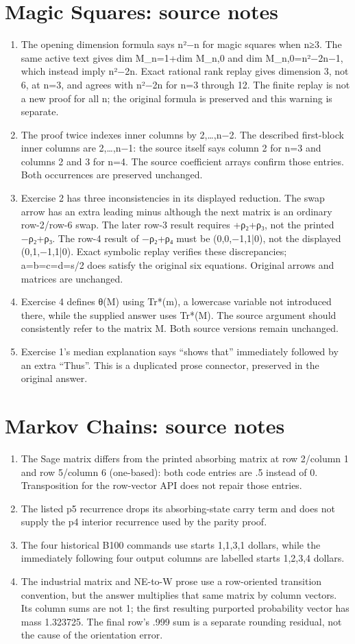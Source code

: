 \section*{Magic Squares: source notes}
\begin{enumerate}
\item The opening dimension formula says n²−n for magic squares when n≥3. The same active text gives dim M\_n=1+dim M\_n,0 and dim M\_n,0=n²−2n−1, which instead imply n²−2n. Exact rational rank replay gives dimension 3, not 6, at n=3, and agrees with n²−2n for n=3 through 12. The finite replay is not a new proof for all n; the original formula is preserved and this warning is separate.
\item The proof twice indexes inner columns by 2,…,n−2. The described first-block inner columns are 2,…,n−1: the source itself says column 2 for n=3 and columns 2 and 3 for n=4. The source coefficient arrays confirm those entries. Both occurrences are preserved unchanged.
\item Exercise 2 has three inconsistencies in its displayed reduction. The swap arrow has an extra leading minus although the next matrix is an ordinary row-2/row-6 swap. The later row-3 result requires +ρ₂+ρ₃, not the printed −ρ₂+ρ₃. The row-4 result of −ρ₂+ρ₄ must be (0,0,−1,1|0), not the displayed (0,1,−1,1|0). Exact symbolic replay verifies these discrepancies; a=b=c=d=s/2 does satisfy the original six equations. Original arrows and matrices are unchanged.
\item Exercise 4 defines θ(M) using Tr*(m), a lowercase variable not introduced there, while the supplied answer uses Tr*(M). The source argument should consistently refer to the matrix M. Both source versions remain unchanged.
\item Exercise 1’s median explanation says “shows that” immediately followed by an extra “Thus”. This is a duplicated prose connector, preserved in the original answer.
\end{enumerate}
\section*{Markov Chains: source notes}
\begin{enumerate}
\item The Sage matrix differs from the printed absorbing matrix at row 2/column 1 and row 5/column 6 (one-based): both code entries are .5 instead of 0. Transposition for the row-vector API does not repair those entries.
\item The listed p5 recurrence drops its absorbing-state carry term and does not supply the p4 interior recurrence used by the parity proof.
\item The four historical B100 commands use starts 1,1,3,1 dollars, while the immediately following four output columns are labelled starts 1,2,3,4 dollars.
\item The industrial matrix and NE-to-W prose use a row-oriented transition convention, but the answer multiplies that same matrix by column vectors. Its column sums are not 1; the first resulting purported probability vector has mass 1.323725. The final row’s .999 sum is a separate rounding residual, not the cause of the orientation error.
\end{enumerate}
